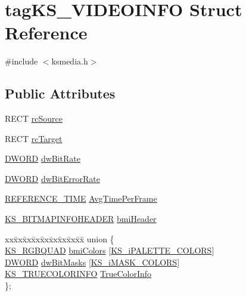 \hypertarget{structtag_k_s___v_i_d_e_o_i_n_f_o}{}\section{tag\+K\+S\+\_\+\+V\+I\+D\+E\+O\+I\+N\+FO Struct Reference}
\label{structtag_k_s___v_i_d_e_o_i_n_f_o}


{\ttfamily \#include $<$ksmedia.\+h$>$}

\subsection*{Public Attributes}
\begin{DoxyCompactItemize}
\item 
R\+E\+CT \hyperlink{structtag_k_s___v_i_d_e_o_i_n_f_o_a9050c2f1adccecb1ccc8536d2b11a088}{rc\+Source}
\item 
R\+E\+CT \hyperlink{structtag_k_s___v_i_d_e_o_i_n_f_o_a77ad115ba35d10418f83870f7b7d946d}{rc\+Target}
\item 
\hyperlink{mapinls_8h_ad342ac907eb044443153a22f964bf0af}{D\+W\+O\+RD} \hyperlink{structtag_k_s___v_i_d_e_o_i_n_f_o_a16268bf2cd18f8598140e8cfb4865067}{dw\+Bit\+Rate}
\item 
\hyperlink{mapinls_8h_ad342ac907eb044443153a22f964bf0af}{D\+W\+O\+RD} \hyperlink{structtag_k_s___v_i_d_e_o_i_n_f_o_a819427319a60dd66a50e7501ecda7923}{dw\+Bit\+Error\+Rate}
\item 
\hyperlink{ksmedia_8h_a83927f70641d4e9a344563bd9ddb15ae}{R\+E\+F\+E\+R\+E\+N\+C\+E\+\_\+\+T\+I\+ME} \hyperlink{structtag_k_s___v_i_d_e_o_i_n_f_o_a87eee8e9df1d8d9f46e3e23820da19c3}{Avg\+Time\+Per\+Frame}
\item 
\hyperlink{ksmedia_8h_a6a2b96637a3edc2842d6edf85f090516}{K\+S\+\_\+\+B\+I\+T\+M\+A\+P\+I\+N\+F\+O\+H\+E\+A\+D\+ER} \hyperlink{structtag_k_s___v_i_d_e_o_i_n_f_o_a31439cf69782931dae1c356498ed8942}{bmi\+Header}
\item 
\begin{tabbing}
xx\=xx\=xx\=xx\=xx\=xx\=xx\=xx\=xx\=\kill
union \{\\
\>\hyperlink{ksmedia_8h_ae45da45c9265515c30d4fda6c6d353ad}{KS\_RGBQUAD} \hyperlink{structtag_k_s___v_i_d_e_o_i_n_f_o_ab1b369bff93473400214e23054b368f2}{bmiColors} \mbox{[}\hyperlink{ksmedia_8h_a1b6b2c1c243617aa373aefb6afbf1489}{KS\_iPALETTE\_COLORS}\mbox{]}\\
\>\hyperlink{mapinls_8h_ad342ac907eb044443153a22f964bf0af}{DWORD} \hyperlink{structtag_k_s___v_i_d_e_o_i_n_f_o_a61380c2aaae526f23d5701b4773490b7}{dwBitMasks} \mbox{[}\hyperlink{ksmedia_8h_aa9ac4ee1a8eb49371551b3fcc788d1a2}{KS\_iMASK\_COLORS}\mbox{]}\\
\>\hyperlink{ksmedia_8h_a39e2ef901c0522823ac05e3b32fc7ba3}{KS\_TRUECOLORINFO} \hyperlink{structtag_k_s___v_i_d_e_o_i_n_f_o_aa2e9c6ea3391913150f01b5b12c9f8e1}{TrueColorInfo}\\
\}; \\

\end{tabbing}\end{DoxyCompactItemize}


